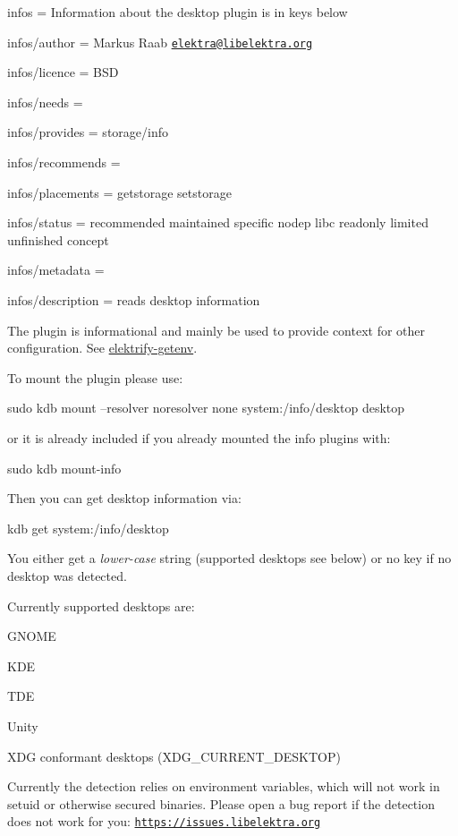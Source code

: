 
\begin{DoxyItemize}
\item infos = Information about the desktop plugin is in keys below
\item infos/author = Markus Raab \href{mailto:elektra@libelektra.org}{\tt elektra@libelektra.\+org}
\item infos/licence = B\+SD
\item infos/needs =
\item infos/provides = storage/info
\item infos/recommends =
\item infos/placements = getstorage setstorage
\item infos/status = recommended maintained specific nodep libc readonly limited unfinished concept
\item infos/metadata =
\item infos/description = reads desktop information
\end{DoxyItemize}

The plugin is informational and mainly be used to provide context for other configuration. See \hyperlink{src_libs_getenv_README_md}{elektrify-\/getenv}.

To mount the plugin please use\+:


\begin{DoxyCode}
sudo kdb mount --resolver noresolver none system:/info/desktop desktop
\end{DoxyCode}


or it is already included if you already mounted the info plugins with\+:


\begin{DoxyCode}
sudo kdb mount-info
\end{DoxyCode}


Then you can get desktop information via\+:


\begin{DoxyCode}
kdb get system:/info/desktop
\end{DoxyCode}


You either get a {\itshape lower-\/case} string (supported desktops see below) or no key if no desktop was detected.

Currently supported desktops are\+:


\begin{DoxyItemize}
\item G\+N\+O\+ME
\item K\+DE
\item T\+DE
\item Unity
\item X\+DG conformant desktops ({\ttfamily X\+D\+G\+\_\+\+C\+U\+R\+R\+E\+N\+T\+\_\+\+D\+E\+S\+K\+T\+OP})
\end{DoxyItemize}

Currently the detection relies on environment variables, which will not work in setuid or otherwise secured binaries. Please open a bug report if the detection does not work for you\+: \href{https://issues.libelektra.org}{\tt https\+://issues.\+libelektra.\+org} 